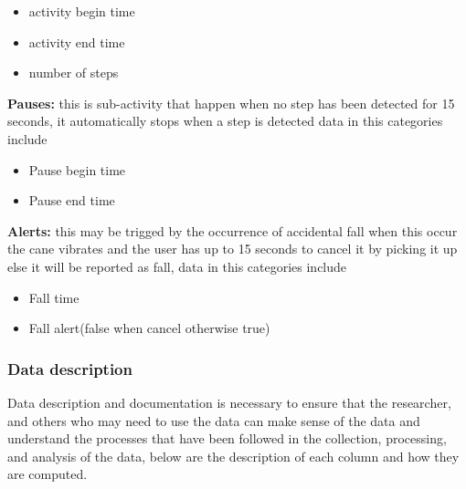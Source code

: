 \documentclass[a4paper, parskip=full]{scrartcl}
\begin{document}
\begin{itemize}
	
	\item   activity begin time
	
	\item  activity end time
	
	\item   number of steps	
	
\end{itemize}

\textbf{Pauses:} this is sub-activity that happen when no step has been detected for 15 seconds, it automatically stops when a step is detected data in this categories include 
\begin{itemize}
	
	\item   Pause begin time
	
	\item   Pause end time	
	
\end{itemize}

\textbf{Alerts:} this may be trigged by the occurrence of accidental fall when this occur the cane vibrates and the user has up to 15 seconds to cancel it by picking it up else it will be reported as fall,  data in this categories include
  
\begin{itemize}
	\item   Fall time
	
	\item   Fall alert(false when cancel otherwise true)
\end{itemize}

\subsubsection*{Data description}
	
Data description and documentation is necessary to ensure that the researcher, and others who may need to use the data can make sense of the data and understand the processes that have been followed in the collection, processing, and analysis of the data, below are the description of each column and how they are computed.
\end{document}
